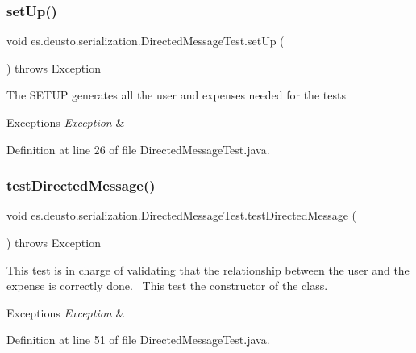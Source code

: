 \subsubsection{\texorpdfstring{set\+Up()}{setUp()}}
{\footnotesize\ttfamily void es.\+deusto.\+serialization.\+Directed\+Message\+Test.\+set\+Up (\begin{DoxyParamCaption}{ }\end{DoxyParamCaption}) throws Exception}

The S\+E\+T\+UP generates all the user and expenses needed for the tests 
\begin{DoxyExceptions}{Exceptions}
{\em Exception} & \\
\hline
\end{DoxyExceptions}


Definition at line 26 of file Directed\+Message\+Test.\+java.

\mbox{\label{classes_1_1deusto_1_1serialization_1_1_directed_message_test_a704726ef8705632cb089bc25d8283b75}} 
\subsubsection{\texorpdfstring{test\+Directed\+Message()}{testDirectedMessage()}}
{\footnotesize\ttfamily void es.\+deusto.\+serialization.\+Directed\+Message\+Test.\+test\+Directed\+Message (\begin{DoxyParamCaption}{ }\end{DoxyParamCaption}) throws Exception}

This test is in charge of validating that the relationship between the user and the expense is correctly done.~\newline
This test the constructor of the class. 
\begin{DoxyExceptions}{Exceptions}
{\em Exception} & \\
\hline
\end{DoxyExceptions}


Definition at line 51 of file Directed\+Message\+Test.\+java.

\mbox{\label{classes_1_1deusto_1_1serialization_1_1_directed_message_test_a142287faad08832ef77c93c8e1ffe0b3}} 
